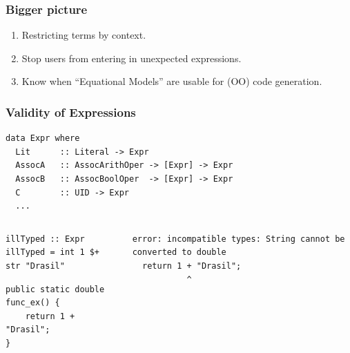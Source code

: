 \documentclass[xcolor={dvipsnames}]{beamer}
\begin{document}
\begin{frame}
  \frametitle{Bigger picture}

  \begin{enumerate}
    \item Restricting terms by context.
    \item Stop users from entering in unexpected expressions.
    \item Know when ``Equational Models'' are usable for (OO) code generation.
  \end{enumerate}

\end{frame}

\begin{frame}[fragile]
  \frametitle{Validity of Expressions}

\begin{verbatim}
data Expr where
  Lit      :: Literal -> Expr
  AssocA   :: AssocArithOper -> [Expr] -> Expr
  AssocB   :: AssocBoolOper  -> [Expr] -> Expr
  C        :: UID -> Expr
  ...
\end{verbatim}

\begin{columns}
  \begin{column}{0.575\textwidth}
    \begin{verbatim}
illTyped :: Expr
illTyped = int 1 $+ str "Drasil"
    \end{verbatim}
    \vspace{0.5em}
    \begin{verbatim}
public static double func_ex() {
    return 1 + "Drasil";
}
    \end{verbatim}
  \end{column}
  \hfill
  \begin{column}{0.375\textwidth}
    \begin{verbatim}
error: incompatible types: String cannot be converted to double
  return 1 + "Drasil";
           ^
    \end{verbatim}
  \end{column}
\end{columns}

\end{frame}
\end{document}
